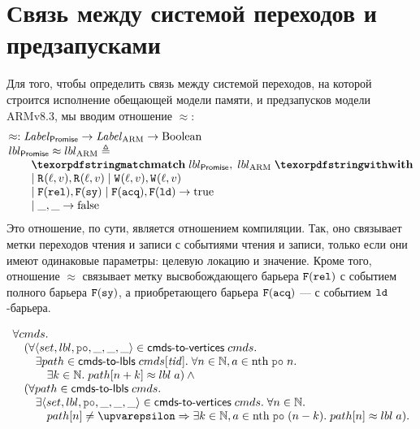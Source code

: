 \section{Связь между системой переходов и предзапусками}
\label{sec:lts-rel}
Для того, чтобы определить связь между системой переходов, на которой строится исполнение
обещающей модели памяти, и предзапусков модели ARMv8.3, мы вводим отношение $\approx$:
\[\inarr{
  \approx : \Label_{\Promise} \rightarrow \Label_{\ARM} \rightarrow {\rm Boolean} \\
  lbl_{\Promise} \approx lbl_{\ARM} \defeq \\
  \qquad \kw{match} \; lbl_{\Promise}, \; lbl_{\ARM} \; \kw{with} \\
  \qquad
    \begin{array}{@{}l}
      \mid \rlab{}{\loc}{\val}, \rlab{}{\loc}{\val}
      \mid \wlab{}{\loc}{\val}, \wlab{}{\loc}{\val} \\
      \mid \flab{\rel}, \flab{\SY}
      \mid \flab{\acq}, \flab{\LD} \rightarrow {\rm true} \\
      \mid \_, \_ \rightarrow {\rm false}
    \end{array}
}\]
Это отношение, по сути, является отношением компиляции. Так, оно связывает метки переходов
чтения и записи с событиями чтения и записи, только если они имеют одинаковые параметры: целевую локацию
и значение. Кроме того, отношение $\approx$ связывает метку высвобождающего барьера ${{\mathtt{F}}}({\mathtt{rel}})$
с событием полного барьера ${{\mathtt{F}}}(\mathtt{sy})$, а приобретающего барьера ${{\mathtt{F}}}({\mathtt{acq}})$ --- с событием $\mathtt{ld}$-барьера.


\begin{theorem}
  \label{thm:compl-state-preexec}
\[\inarr{
\forall \Carm. \\
\quad (\forall \tup{set, lbl, \lPO, \_, \_, \_} \in \cmdsToVrtxs \; \Carm. \\
\qquad \exists path \in \cmdsToLbls \; \Carm[\tId]. \; \forall n \in \mathbb{N}, a \in \nthf \; \lPO \; n. \\
\qquad \quad \exists k \in \mathbb{N}. \; path[n + k] \approx lbl \; a) \land {} \\
\quad (\forall path \in \cmdsToLbls \; \Carm. \\
\qquad \exists \tup{set, lbl, \lPO, \_, \_, \_} \in \cmdsToVrtxs \; \Carm. \;
  \forall n \in \mathbb{N}. \\
\qquad \quad path[n] \neq \epsilon \Rightarrow \exists k \in \mathbb{N}, a \in \nthf \; \lPO \; (n - k). \; path[n] \approx lbl \; a).
}\]
\end{theorem}

